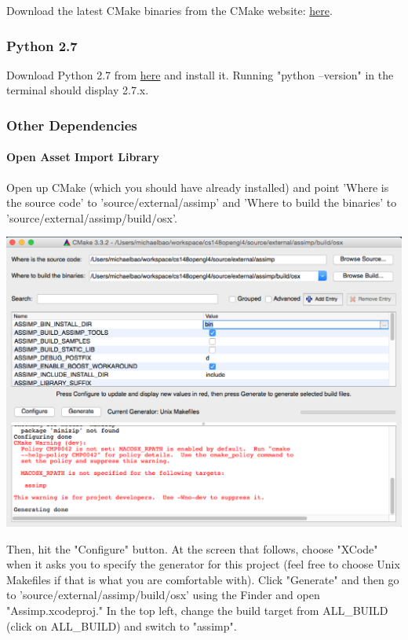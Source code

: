 \documentclass{article}
\begin{document}
Download the latest CMake binaries from the CMake website: \href{http://www.cmake.org/download/}{here}.

\subsubsection*{Python 2.7}

Download Python 2.7 from \href{https://www.python.org/download/releases/2.7/}{here} and install it. Running "python --version" in the terminal should display 2.7.x.

\subsubsection*{Other Dependencies}

\paragraph{\textbf{Open Asset Import Library}}

Open up CMake (which you should have already installed) and point 'Where is the source code' to 'source/external/assimp' and 'Where to build the binaries' to 'source/external/assimp/build/osx'. 

\includegraphics[width=\linewidth]{assimp1.png}

Then, hit the "Configure" button. At the screen that follows, choose "XCode" when it asks you to specify the generator for this project (feel free to choose Unix Makefiles if that is what you are comfortable with). Click "Generate" and then go to 'source/external/assimp/build/osx' using the Finder and open "Assimp.xcodeproj." In the top left, change the build target from ALL\_BUILD (click on ALL\_BUILD) and switch to "assimp".
\end{document}
